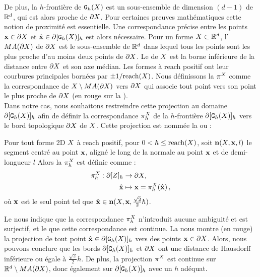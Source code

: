 De plus, la $h$-frontière de $\mathtt{G}_{h}(X)$ est un sous-ensemble de dimension $(d-1)$ de
$\mathbb{R}^d$, qui est alors proche de $\partial X$. Pour certaines preuves
mathématiques cette notion de proximité est essentielle. Une correspondance
précise entre les points $\mathbf{x} \in \partial X$ et $\hat{\mathbf{x}}\in \partial\lbrack \mathtt{G}_{h}(X) \rbrack_{h}$
est alors nécessaire. Pour un forme $X \subset \mathbb{R}^d$, l' $MA(\partial X)$ de $\partial X$ est le sous-ensemble de $\mathbb{R}^d$ dans lequel tous les
points sont les plus proche d'au moins deux points de $\partial X$. Le 
de $X$ est la borne inférieure de la distance entre $\partial X$ et son axe
médian. Les formes à reach positif ont leur courbures principales bornées par
$\pm 1 / \mathrm{reach}(X)$. Nous définissons la 
$\pi^{X}$ comme la correspondance de $X \setminus MA(\partial X)$ vers
$\partial X$ qui associe tout point vers son point le plus proche de $\partial X$ (en rouge
sur la ).
%
\\
%
Dans notre cas, nous souhaitons restreindre cette projection au domaine
$\partial\lbrack \mathtt{G}_{h}(X) \rbrack_{h}$ afin de définir la correspondance $\pi_h^{X}$ de la
$h$-frontière $\partial\lbrack \mathtt{G}_{h}(X) \rbrack_{h}$ vers le bord topologique $\partial X$ de
$X$. Cette projection est nommée la  ou
 \cite{Lachaud2006} :
%
\begin{definition}{}
\label{def:projection}
%
  Pour tout forme 2D $X$ à reach positif, pour $0 < h \le \mathrm{reach}(X)$,
  soit $\mathbf{n}(X,\mathbf{x},l)$ le segment centré au point $\mathbf{x}$, aligné le
  long de la normale au point $\mathbf{x}$ et de demi-longueur $l$ Alors la
   $\pi_h^{X}$ est définie comme :
  \begin{align}
    \pi_h^{X}: \partial\lbrack Z \rbrack_{h} &\rightarrow \partial X, \nonumber \\
    \hat{\mathbf{x}} &\mapsto \mathbf{x}=\pi_h^{X}(\hat{\mathbf{x}}) \,,
  \end{align}
  où $\mathbf{x}$ est le seul point tel que $\hat{\mathbf{x}} \in
  \mathbf{n}(X,\mathbf{x},\frac{\sqrt{2}}{2}h)$.
%
\end{definition}
%
Le  nous indique que la correspondance $\pi_h^{X}$
n'introduit aucune ambiguité et est surjectif, et le
 que cette correspondance est continue. La
 nous montre (en rouge) la projection de tout point
$\hat{\mathbf{x}} \in \partial\lbrack \mathtt{G}_{h}(X) \rbrack_{h}$ vers des points $\mathbf{x} \in \partial X$. Alors,
nous pouvons conclure que les bords $\partial\lbrack \mathtt{G}_{h}(X) \rbrack_{h}$ et $\partial X$ ont une
distance de Hausdorff inférieure ou égale à $\frac{\sqrt{2}}{2}h$. De plus, la
projection $\pi^{X}$ est continue sur $\mathbb{R}^d \setminus MA(\partial X)$, donc
également sur $\partial\lbrack \mathtt{G}_{h}(X) \rbrack_{h}$ avec un $h$ adéquat.
%

